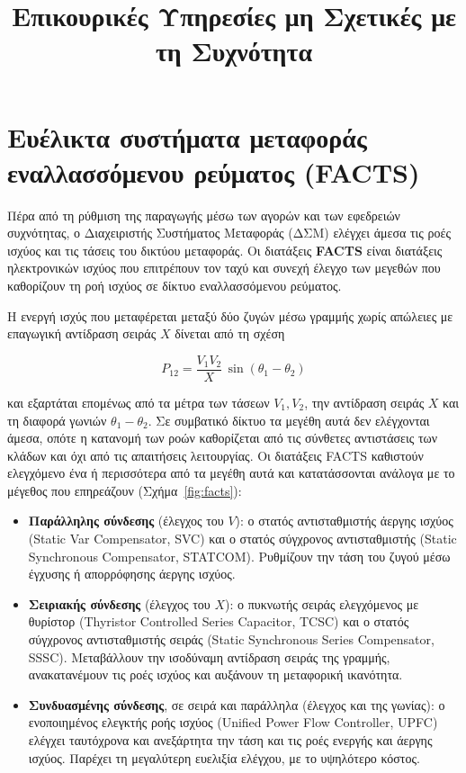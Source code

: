 \title{Επικουρικές Υπηρεσίες μη Σχετικές με τη Συχνότητα}

\section{Ευέλικτα συστήματα μεταφοράς εναλλασσόμενου ρεύματος (FACTS)}
\label{kef-02-theoria}

Πέρα από τη ρύθμιση της παραγωγής μέσω των αγορών και των εφεδρειών συχνότητας, ο Διαχειριστής
Συστήματος Μεταφοράς (ΔΣΜ) ελέγχει άμεσα τις ροές ισχύος και τις τάσεις του δικτύου μεταφοράς. Οι διατάξεις
\textbf{FACTS} είναι διατάξεις ηλεκτρονικών ισχύος που
επιτρέπουν τον ταχύ και συνεχή έλεγχο των μεγεθών που καθορίζουν τη ροή ισχύος σε δίκτυο
εναλλασσόμενου ρεύματος.

Η ενεργή ισχύς που μεταφέρεται μεταξύ δύο ζυγών μέσω γραμμής χωρίς απώλειες με επαγωγική
αντίδραση σειράς $X$ δίνεται από τη σχέση

\begin{equation}
P_{12} = \frac{V_1 V_2}{X}\,\sin(\theta_1 - \theta_2)
\label{eq:facts-powerflow}
\end{equation}

και εξαρτάται επομένως από τα μέτρα των τάσεων $V_1, V_2$, την αντίδραση σειράς $X$ και τη
διαφορά γωνιών $\theta_1 - \theta_2$. Σε
συμβατικό δίκτυο τα μεγέθη αυτά δεν ελέγχονται άμεσα, οπότε η κατανομή των ροών καθορίζεται
από τις σύνθετες αντιστάσεις των κλάδων και όχι από τις απαιτήσεις λειτουργίας. Οι διατάξεις
FACTS καθιστούν ελεγχόμενο ένα ή περισσότερα από τα μεγέθη αυτά και κατατάσσονται ανάλογα με
το μέγεθος που επηρεάζουν (Σχήμα~\ref{fig:facts}):

\begin{itemize}
\item \textbf{Παράλληλης σύνδεσης} (έλεγχος του $V$): ο στατός αντισταθμιστής άεργης ισχύος
      (Static Var Compensator, SVC) και ο στατός σύγχρονος αντισταθμιστής (Static
      Synchronous Compensator, STATCOM). Ρυθμίζουν την τάση του ζυγού μέσω έγχυσης ή
      απορρόφησης άεργης ισχύος.
\item \textbf{Σειριακής σύνδεσης} (έλεγχος του $X$): ο πυκνωτής σειράς ελεγχόμενος με
      θυρίστορ (Thyristor Controlled Series Capacitor, TCSC) και ο στατός σύγχρονος
      αντισταθμιστής σειράς (Static Synchronous Series Compensator, SSSC). Μεταβάλλουν την
      ισοδύναμη αντίδραση σειράς της γραμμής, ανακατανέμουν τις ροές ισχύος και αυξάνουν τη
      μεταφορική ικανότητα.
\item \textbf{Συνδυασμένης σύνδεσης}, σε σειρά και παράλληλα (έλεγχος και της γωνίας): ο
      ενοποιημένος ελεγκτής ροής ισχύος (Unified Power Flow Controller, UPFC) ελέγχει
      ταυτόχρονα και ανεξάρτητα την τάση και τις ροές ενεργής και άεργης ισχύος. Παρέχει τη
      μεγαλύτερη ευελιξία ελέγχου, με το υψηλότερο κόστος.
\end{itemize}

